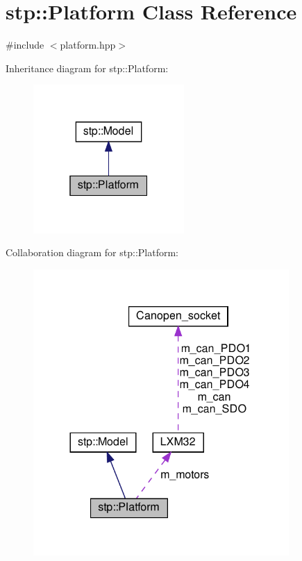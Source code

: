 \hypertarget{classstp_1_1_platform}{}\section{stp\+:\+:Platform Class Reference}
\label{classstp_1_1_platform}


{\ttfamily \#include $<$platform.\+hpp$>$}



Inheritance diagram for stp\+:\+:Platform\+:
\nopagebreak
\begin{figure}[H]
\begin{center}
\leavevmode
\includegraphics[width=163pt]{classstp_1_1_platform__inherit__graph}
\end{center}
\end{figure}


Collaboration diagram for stp\+:\+:Platform\+:
\nopagebreak
\begin{figure}[H]
\begin{center}
\leavevmode
\includegraphics[width=276pt]{classstp_1_1_platform__coll__graph}
\end{center}
\end{figure}
